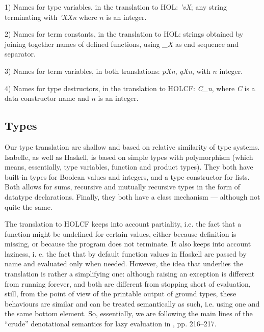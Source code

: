 \documentclass{llncs}
\begin{document}
1) Names for type variables, in the translation to HOL: \emph{'vX}; any string
terminating with \emph{'XXn} where $n$ is an integer.

2) Names for term constants, in the translation to HOL: strings obtained by
joining together names of defined functions, using \emph{\_X} as end sequence
and separator.

3) Names for term variables, in both translations: \emph{pXn}, \emph{qXn},
with $n$ integer.

4) Names for type destructors, in the translation to HOLCF: \emph{C\_n},
where \emph{C} is a data constructor name and $n$ is an integer.



\subsection{Types}

Our type translation are shallow and based on relative similarity of type
systems. Isabelle, as well as Haskell, is based on simple types with
polymorphism (which means, essentially, type variables, function and product
types). They both have built-in types for Boolean values and integers, and a
type constructor for lists. Both allows for sums, recursive and mutually
recursive types in the form of datatype declarations. Finally, they both have
a class mechanism --- although not quite the same.

The translation to HOLCF keeps into account partiality, i.e.  the fact that a
function might be undefined for certain values, either because definition is
missing, or because the program does not terminate.  It also keeps into
account laziness, i.  e.  the fact that by default function values in Haskell
are passed by name and evaluated only when needed.  However, the idea that
underlies the translation is rather a simplifying one: although raising an
exception is different from running forever, and both are different from
stopping short of evaluation, still, from the point of view of the printable
output of ground types, these behaviours are similar and can be treated
semantically as such, i.e.  using one and the same bottom element.  So,
essentially, we are following the main lines of the ``crude'' denotational
semantics for lazy evaluation in \cite{winskel}, pp.  216--217.
\end{document}
